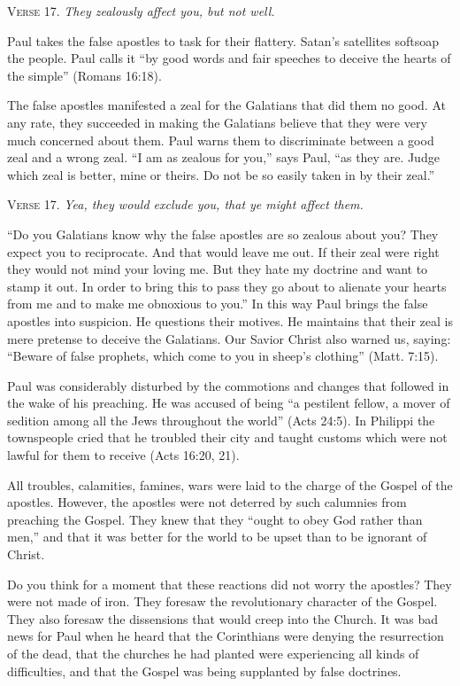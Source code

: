 \textsc{Verse} 17. \emph{They zealously affect you, but not well.}

Paul takes the false apostles to task for their flattery. Satan’s satellites softsoap the people. Paul calls it “by good words and fair speeches to deceive the hearts of the simple” (Romans 16:18).

The false apostles manifested a zeal for the Galatians that did them no good. At any rate, they succeeded in making the Galatians believe that they were very much concerned about them. Paul warns them to discriminate between a good zeal and a wrong zeal. “I am as zealous for you,” says Paul, “as they are. Judge which zeal is better, mine or theirs. Do not be so easily taken in by their zeal.”

\textsc{Verse} 17. \emph{Yea, they would exclude you, that ye might affect them.}

“Do you Galatians know why the false apostles are so zealous about you? They expect you to reciprocate. And that would leave me out. If their zeal were right they would not mind your loving me. But they hate my doctrine and want to stamp it out. In order to bring this to pass they go about to alienate your hearts from me and to make me obnoxious to you.” In this way Paul brings the false apostles into suspicion. He questions their motives. He maintains that their zeal is mere pretense to deceive the Galatians. Our Savior Christ also warned us, saying: “Beware of false prophets, which come to you in sheep’s clothing” (Matt. 7:15).

Paul was considerably disturbed by the commotions and changes that followed in the wake of his preaching. He was accused of being “a pestilent fellow, a mover of sedition among all the Jews throughout the world” (Acts 24:5). In Philippi the townspeople cried that he troubled their city and taught customs which were not lawful for them to receive (Acts 16:20, 21).

All troubles, calamities, famines, wars were laid to the charge of the Gospel of the apostles. However, the apostles were not deterred by such calumnies from preaching the Gospel. They knew that they “ought to obey God rather than men,” and that it was better for the world to be upset than to be ignorant of Christ.

Do you think for a moment that these reactions did not worry the apostles? They were not made of iron. They foresaw the revolutionary character of the Gospel. They also foresaw the dissensions that would creep into the Church. It was bad news for Paul when he heard that the Corinthians were denying the resurrection of the dead, that the churches he had planted were experiencing all kinds of difficulties, and that the Gospel was being supplanted by false doctrines.

